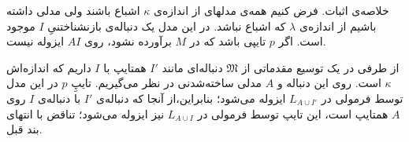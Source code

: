 \documentclass[12pt,a4paper]{report}
\theoremstyle{colorhead}
\begin{document}
	\begin{framed}
	خلاصه‌ی اثبات. فرض کنیم همه‌ی مدلهای از اندازه‌ی
	$\kappa$
	اشباع باشند ولی مدلی داشته باشیم از اندازه‌ی
	$\lambda$
که اشباع نباشد.
در این مدل یک دنباله‌ی بازنشناختنیِ 
$I$
موجود است. 
اگر
$p$
تایپی باشد که در
$M$
برآورده نشود، روی
$AI$
ایزوله نیست. 
\par 
از طرفی در یک توسیع مقدماتی از
$\mathfrak{M}$
دنباله‌ای
مانند 
$I'$
 همتایپ با
$I$
داریم که اندازه‌اش
$\kappa$
است. روی این دنباله و 
$A$
مدلی ساخته‌شدنی در نظر می‌گیریم. 
تایپِ
$p$
در این مدل توسط فرمولی در 
$L_{A\cup I'}$
ایزوله می‌شود؛
بنابراین،از آنجا که دنباله‌ی 
$I'$
با دنباله‌ی
$I$
روی 
$A$
همتایپ است،
 این تایپ توسط فرمولی در 
$L_{A\cup I}$
نیز
ایزوله می‌شود؛ تناقض با انتهای بند قبل.
	\end{framed}
\end{document}
